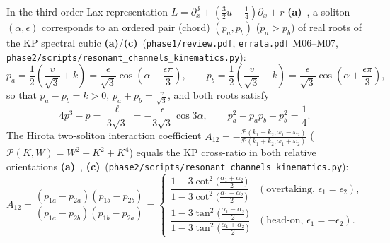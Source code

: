 \documentclass[11pt,a4paper]{article}
\newcommand{\La}{\textsf{\textbf{(a)}}\xspace}
\newcommand{\Lc}{\textsf{\textbf{(c)}}\xspace}
\newcommand{\skin}{\texttt{phase2/\allowbreak scripts/\allowbreak resonant\_\allowbreak channels\_\allowbreak kinematics.py}}
\theoremstyle{remark}
\begin{document}
In the third-order Lax representation $L = \partial_x^3 + (\frac{3}{2}u - \frac{1}{4})\partial_x + r$
\La~\cite{Zak,Dickey}, a soliton $(\alpha,\epsilon)$ corresponds to an ordered
pair (chord) $(p_a,p_b)$ ($p_a > p_b$) of real roots of the KP spectral cubic \La/\Lc\
(\texttt{phase1/\allowbreak review.pdf}, \texttt{errata.pdf} M06--M07, \skin):
\begin{equation}\label{eq:kp_roots}
  p_a = \frac{1}{2}\!\left(\frac{v}{\sqrt{3}} + k\right)
      = \frac{\epsilon}{\sqrt{3}}\cos\!\left(\alpha - \frac{\epsilon\pi}{3}\right), \qquad
  p_b = \frac{1}{2}\!\left(\frac{v}{\sqrt{3}} - k\right)
      = \frac{\epsilon}{\sqrt{3}}\cos\!\left(\alpha + \frac{\epsilon\pi}{3}\right),
\end{equation}
so that $p_a - p_b = k > 0$, $p_a + p_b = \frac{v}{\sqrt{3}}$, and both roots
satisfy
\begin{equation}\label{eq:kp_cubic}
  4p^3 - p = \frac{\ell}{3\sqrt{3}} = -\frac{\epsilon}{3\sqrt{3}}\cos 3\alpha, \qquad
  p_a^2 + p_a p_b + p_b^2 = \frac{1}{4}.
\end{equation}
The Hirota two-soliton interaction coefficient
$A_{12} = -\frac{\mathcal{P}(k_1-k_2,\omega_1-\omega_2)}{\mathcal{P}(k_1+k_2,\omega_1+\omega_2)}$
($\mathcal{P}(K,W) = W^2 - K^2 + K^4$) equals the KP cross-ratio in both
relative orientations \La~\cite{DMHC}, \Lc\ (\skin):
\begin{equation}\label{eq:A12_crossratio}
  A_{12} = \frac{(p_{1a} - p_{2a})(p_{1b} - p_{2b})}{(p_{1a} - p_{2b})(p_{1b} - p_{2a})}
  = \begin{cases}
    \dfrac{1 - 3\cot^2\!\big(\frac{\alpha_1+\alpha_2}{2}\big)}{1 - 3\cot^2\!\big(\frac{\alpha_1-\alpha_2}{2}\big)}
    & (\text{overtaking, }\epsilon_1 = \epsilon_2), \\[10pt]
    \dfrac{1 - 3\tan^2\!\big(\frac{\alpha_1-\alpha_2}{2}\big)}{1 - 3\tan^2\!\big(\frac{\alpha_1+\alpha_2}{2}\big)}
    & (\text{head-on, }\epsilon_1 = -\epsilon_2).
  \end{cases}
\end{equation}
\end{document}

